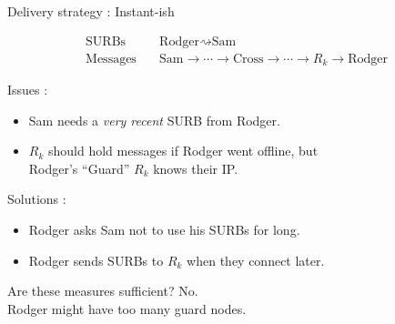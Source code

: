 
\begin{frame}[t]{Delivery strategy : Instant-ish }

\[ \begin{aligned}
\textrm{SURBs}\quad & \textrm{Rodger} \rightsquigarrow \textrm{Sam} \\
\textrm{Messages}\quad & \textrm{Sam} \to \cdots \to \textrm{Cross} \to \cdots \to R_k \to \textrm{Rodger}
\end{aligned} \]

Issues :
\begin{itemize}
\item Sam needs a {\em very recent} SURB from Rodger.  
\item $R_k$ should hold messages if Rodger went offline, but \\ 
 \hspace*{2pt} Rodger's ``Guard'' $R_k$ knows their IP. \\
\end{itemize}


Solutions : 
\begin{itemize}
\item Rodger asks Sam not to use his SURBs for long. \\
\item Rodger sends SURBs to $R_k$ when they connect later.
\end{itemize}

\bigskip
Are these measures sufficient?  No. \\
 \hspace*{2pt} Rodger might have too many guard nodes.

\end{frame}


